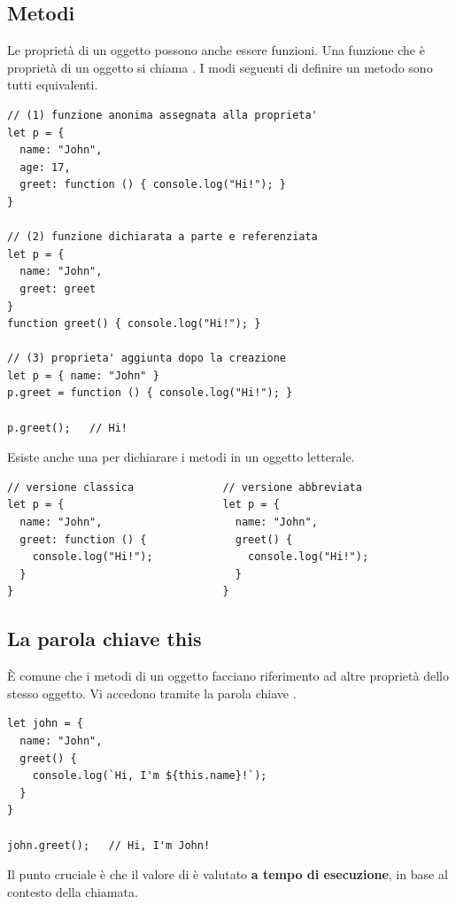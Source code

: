 \subsection{Metodi}

Le proprietà di un oggetto possono anche essere funzioni. Una funzione che è
proprietà di un oggetto si chiama . I modi seguenti di definire un
metodo sono tutti equivalenti.

\begin{lstlisting}[style=js, name=metodi.js]
// (1) funzione anonima assegnata alla proprieta'
let p = {
  name: "John",
  age: 17,
  greet: function () { console.log("Hi!"); }
}

// (2) funzione dichiarata a parte e referenziata
let p = {
  name: "John",
  greet: greet
}
function greet() { console.log("Hi!"); }

// (3) proprieta' aggiunta dopo la creazione
let p = { name: "John" }
p.greet = function () { console.log("Hi!"); }

p.greet();   // Hi!
\end{lstlisting}

Esiste anche una  per dichiarare i metodi in un
oggetto letterale.

\begin{lstlisting}[style=js, name=shorthand.js]
// versione classica              // versione abbreviata
let p = {                         let p = {
  name: "John",                     name: "John",
  greet: function () {              greet() {
    console.log("Hi!");               console.log("Hi!");
  }                                 }
}                                 }
\end{lstlisting}

\subsection{La parola chiave this}

È comune che i metodi di un oggetto facciano riferimento ad altre proprietà
dello stesso oggetto. Vi accedono tramite la parola chiave .

\begin{lstlisting}[style=js, name=this.js]
let john = {
  name: "John",
  greet() {
    console.log(`Hi, I'm ${this.name}!`);
  }
}

john.greet();   // Hi, I'm John!
\end{lstlisting}

Il punto cruciale è che il valore di  è valutato \textbf{a tempo di
esecuzione}, in base al contesto della chiamata.

